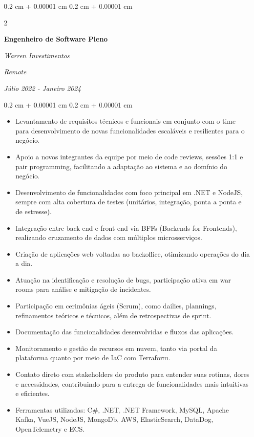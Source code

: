 \documentclass[10pt, letterpaper]{article}
\newenvironment{highlights}{
    \begin{itemize}[
        topsep=0.10 cm,
        parsep=0.10 cm,
        partopsep=0pt,
        itemsep=0pt,
        leftmargin=0.4 cm + 10pt
    ]
}{
    \end{itemize}
} %
\newenvironment{onecolentry}{
    \begin{adjustwidth}{
        0.2 cm + 0.00001 cm
    }{
        0.2 cm + 0.00001 cm
    }
}{
    \end{adjustwidth}
} %
\newenvironment{twocolentry}[2][]{
    \onecolentry
    \def\secondColumn{#2}
    \setcolumnwidth{\fill, 4.5 cm}
    \begin{paracol}{2}
}{
    \switchcolumn \raggedleft \secondColumn
    \end{paracol}
    \endonecolentry
} %
\begin{document}
        \begin{twocolentry}{
        \textit{Remote}    
            
        \textit{Júlio 2022 - Janeiro 2024}}
            \textbf{Engenheiro de Software Pleno}
            
            \textit{Warren Investimentos}
        \end{twocolentry}

        \vspace{0.10 cm}
        \begin{onecolentry}
            \begin{highlights}
                \item Levantamento de requisitos técnicos e funcionais em conjunto com o time para desenvolvimento de novas funcionalidades escaláveis e resilientes para o negócio.
                \item Apoio a novos integrantes da equipe por meio de code reviews, sessões 1:1 e pair programming, facilitando a adaptação ao sistema e ao domínio do negócio.
                \item Desenvolvimento de funcionalidades com foco principal em .NET e NodeJS, sempre com alta cobertura de testes (unitários, integração, ponta a ponta e de estresse).
                \item Integração entre back-end e front-end via BFFs (Backends for Frontends), realizando cruzamento de dados com múltiplos microsserviços.
                \item Criação de aplicações web voltadas ao backoffice, otimizando operações do dia a dia.
                \item Atuação na identificação e resolução de bugs, participação ativa em war rooms para análise e mitigação de incidentes.
                \item Participação em cerimônias ágeis (Scrum), como dailies, plannings, refinamentos teóricos e técnicos, além de retrospectivas de sprint.
                \item Documentação das funcionalidades desenvolvidas e fluxos das aplicações.
                \item Monitoramento e gestão de recursos em nuvem, tanto via portal da plataforma quanto por meio de IaC com Terraform.
                \item Contato direto com stakeholders do produto para entender suas rotinas, dores e necessidades, contribuindo para a entrega de funcionalidades mais intuitivas e eficientes.
                \item Ferramentas utilizadas: C\#, .NET, .NET Framework, MySQL, Apache Kafka, VueJS, NodeJS, MongoDb, AWS, ElasticSearch, DataDog, OpenTelemetry e ECS.
            \end{highlights}
        \end{onecolentry}
\end{document}
